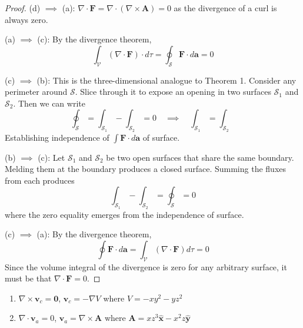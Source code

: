 \documentclass[a4paper]{article}
\begin{document}
\begin{proof}[Proof]
(d) \( \implies \) (a): \( \nabla \cdot \pmb{F} = \nabla \cdot \!\left( \nabla \times \pmb{A} \right) = 0 \) as the divergence of a curl is always zero.

(a) \( \implies \) (c): By the divergence theorem,
\[
	\int_{\mathcal{V}}\!\left( \nabla \cdot \pmb{F} \right) \cdot d \tau = \oint_{\mathcal{S}} \pmb{F} \cdot d \pmb{a} = 0
\]

(c) \( \implies \) (b): This is the three-dimensional analogue to Theorem 1. Consider any perimeter around \( \mathcal{S} \). Slice through it to expose an opening in two surfaces \( \mathcal{S}_{1} \) and \( \mathcal{S}_{2} \). Then we can write
\[
	\oint_{\mathcal{S}} = \int_{\mathcal{S}_{1}} - \int_{\mathcal{S}_{2}} = 0 \quad \implies \quad \int_{\mathcal{S}_{1}} = \int_{\mathcal{S}_{2}}
\]
Establishing independence of \( \int \pmb{F} \cdot d \pmb{a} \) of surface.

(b) \( \implies \) (c): Let \( \mathcal{S}_{1} \) and \( \mathcal{S}_{2} \) be two open surfaces that share the same boundary. Melding them at the boundary produces a closed surface. Summing the fluxes from each produces
\[
	\int_{\mathcal{S}_{1}} - \int_{\mathcal{S}_{2}} = \oint_{\mathcal{S}} = 0 
\]
where the zero equality emerges from the independence of surface.

(c) \( \implies \) (a): By the divergence theorem,
\[
	\oint \pmb{F} \cdot d \pmb{a} = \int_{\mathcal{V}} \!\left( \nabla \cdot \pmb{F} \right) d \tau = 0 
\]
Since the volume integral of the divergence is zero for any arbitrary surface, it must be that \( \nabla \cdot \pmb{F} = 0 \).
\end{proof}


\begin{enumerate}[label=(\alph*)]
	\item \( \nabla \times \pmb{v}_{c} = \pmb{0} \), \( \pmb{v}_{c} = -\nabla V \) where \( V = -xy^{2} - yz^{2} \)
	\item \( \nabla \cdot \pmb{v}_{a} = 0 \), \( \pmb{v}_{a} = \nabla \times \pmb{A} \) where \( \pmb{A} = xz^{3}\pmb{\hat{x}} - x^{2}z \pmb{\hat{y}} \)
\end{enumerate}
\end{document}
